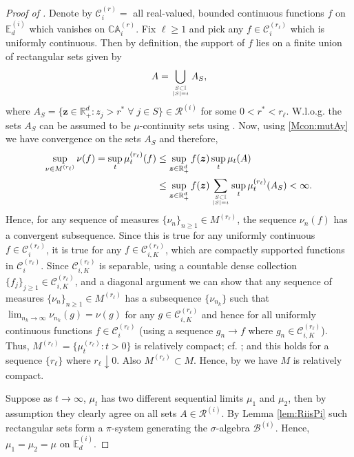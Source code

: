 \documentclass[aos]{imsart}
\numberwithin{equation}{section}
\theoremstyle{plain} %
\theoremstyle{remark}
\newcommand{\E}{\mathbb{E}}
\newcommand{\R}{\mathbb{R}}
\def\bCA{\mathbb{CA}}
\def\cB{\mathcal{B}}
\def\cR{\mathcal{R}}
\def\bz{\boldsymbol z}
\newcommand{\DAS}[1]{{\color{red} #1}}
\begin{document}
\begin{proof}[Proof of ]
 Denote by $\mathcal{C}_{i}^{(r)}=$ all real-valued, bounded continuous functions $f$ on ${\E_d^{(i)}}$ which vanishes on $\bCA_i^{(r)}$. Fix $\ell\ge 1$ and pick any $f\in\mathcal{C}_{i}^{(r_{\ell})} $ which is uniformly continuous. Then by definition, the support of $f$ lies on a finite union of rectangular sets  given by $$A= \bigcup_{\genfrac{}{}{0pt}{}{S\subset\mathbb{I}}{|S|=i}} A_S,$$ where $A_S= \{\bz\in \R_+^d: z_j>r^* \;\forall\; j\in S\} \in \cR^{(i)}$ for some $0< r^*< r_{\ell}$. W.l.o.g. the sets $A_S$ can be assumed  to be $\mu$-continuity sets  using \cite[Lemma 2.5]{lindskog:resnick:roy:2014}. Now, using \eqref{Mcon:mutAy} we have convergence on the sets $A_S$ and  therefore,
\begin{align*}
\sup_{\nu\in M^{(r_{\ell})}} \nu(f)= \sup_t \mu_t^{(r_\ell)}(f) & \le \sup\limits_{\bz\in \R_+^d} f(\bz) \sup\limits_{t} \mu_t(A)\\ &\le \sup\limits_{\bz\in \R_+^d} f(\bz) \sum_{\genfrac{}{}{0pt}{}{S\subset\mathbb{I}}{|S|=i}}\sup\limits_{t} \mu_t^{(r_{\ell})}(A_S)<\infty.
\end{align*}
Hence, for any sequence of measures $\{\nu_n\}_{n\ge1} \in M^{(r_{\ell})}$, the sequence $\nu_n(f)$ has a convergent subsequence. Since this is true for any uniformly continuous $f\in \mathcal{C}_{i}^{(r_{\ell})}$, it is true for any   $f\in \mathcal{C}_{i,K}^{(r_{\ell})}$, which are compactly supported functions in $\mathcal{C}_{i}^{(r_{\ell})}$. Since $\mathcal{C}_{i,K}^{(r_{\ell})}$ is separable, using a countable dense collection $\{f_j\}_{j\ge 1}\in \mathcal{C}_{i,K}^{(r_{\ell})}$, and a diagonal argument we can show that any sequence of measures $\{\nu_n\}_{n\ge1} \in M^{(r_{\ell})}$ has a  subsequence $\{\nu_{n_k}\}$ such that $\lim_{n_k\to\infty}\nu_{n_k}(g)=\nu(g)$ for any $g\in \mathcal{C}_{i,K}^{(r_{\ell})}$ and hence for all uniformly continuous functions $f\in \mathcal{C}_{i}^{(r_{\ell})}$ (using a sequence $g_n \to f$ where $g_n\in \mathcal{C}_{i,K}^{(r_{\ell})}$). Thus, $M^{(r_{\ell})}=\{\mu_t^{(r_{\ell})}:t>0\}$ is relatively compact; cf. \citep[(3.16), p. 51)]{resnickbook:2007}; and this holds for a sequence $\{r_{\ell}\}$ where $r_{\ell}\downarrow 0$. Also $M^{(r_{\ell})} \subset M$. Hence, by \cite[Theorem 2.4]{lindskog:resnick:roy:2014} we have $M$ is relatively compact.

 Suppose as $t\to\infty$, $\mu_t$ has two different sequential limits $\mu_1$ and $\mu_2$, then by assumption they clearly agree on all sets $A\in \cR^{(i)}$. By Lemma \ref{lem:RiisPi} such rectangular sets form a  $\pi$-system generating the $\sigma$-algebra $\cB^{(i)}$. Hence, $\mu_1=\mu_2=\mu$ on $\E_d^{(i)}.$
\end{proof}
\end{document}
